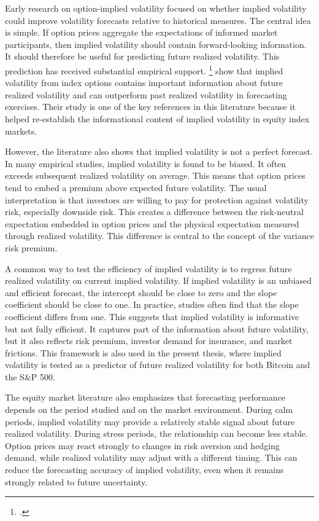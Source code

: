 \documentclass[11pt,a4paper,openany]{report}
\newcommand{\fcitet}[1]{\citet{#1}\footnote{\bibentry{#1}.}}
\begin{document}
Early research on option-implied volatility focused on whether implied
volatility could improve volatility forecasts relative to historical
measures. The central idea is simple. If option prices aggregate the
expectations of informed market participants, then implied volatility
should contain forward-looking information. It should therefore be
useful for predicting future realized volatility. This prediction has
received substantial empirical support. \fcitet{christensen1998} show that implied
volatility from index options contains important information about
future realized volatility and can outperform past realized volatility
in forecasting exercises. Their study is one of the key references in
this literature because it helped re-establish the informational content
of implied volatility in equity index markets.

However, the literature also shows that implied volatility is not a
perfect forecast. In many empirical studies, implied volatility is found
to be biased. It often exceeds subsequent realized volatility on
average. This means that option prices tend to embed a premium above
expected future volatility. The usual interpretation is that investors
are willing to pay for protection against volatility risk, especially
downside risk. This creates a difference between the risk-neutral
expectation embedded in option prices and the physical expectation
measured through realized volatility. This difference is central to the
concept of the variance risk premium.

A common way to test the efficiency of implied volatility is to regress
future realized volatility on current implied volatility. If implied
volatility is an unbiased and efficient forecast, the intercept should
be close to zero and the slope coefficient should be close to one. In
practice, studies often find that the slope coefficient differs from
one. This suggests that implied volatility is informative but not fully
efficient. It captures part of the information about future volatility,
but it also reflects risk premium, investor demand for insurance, and
market frictions. This framework is also used in the present thesis,
where implied volatility is tested as a predictor of future realized
volatility for both Bitcoin and the S\&P 500.

The equity market literature also emphasizes that forecasting
performance depends on the period studied and on the market environment.
During calm periods, implied volatility may provide a relatively stable
signal about future realized volatility. During stress periods, the
relationship can become less stable. Option prices may react strongly to
changes in risk aversion and hedging demand, while realized volatility
may adjust with a different timing. This can reduce the forecasting
accuracy of implied volatility, even when it remains strongly related to
future uncertainty.
\end{document}
